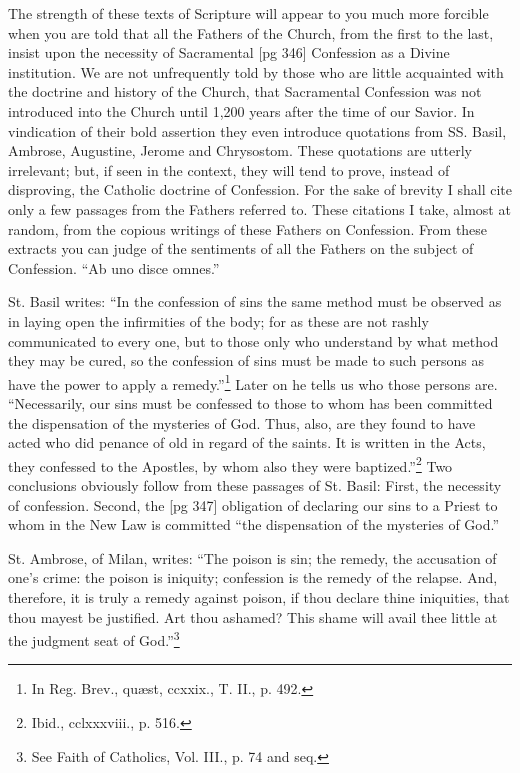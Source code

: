 The strength of these texts of Scripture will appear
to you much more forcible when you are told
that all the Fathers of the Church, from the first
to the last, insist upon the necessity of Sacramental
[pg 346]
Confession as a Divine institution. We
are not unfrequently told by those who are little
acquainted with the doctrine and history of
the Church, that Sacramental Confession was not
introduced into the Church until 1,200 years after
the time of our Savior. In vindication of their
bold assertion they even introduce quotations from
SS. Basil, Ambrose, Augustine, Jerome and
Chrysostom. These quotations are utterly irrelevant;
but, if seen in the context, they will tend
to prove, instead of disproving, the Catholic doctrine
of Confession. For the sake of brevity I
shall cite only a few passages from the Fathers
referred to. These citations I take, almost at
random, from the copious writings of these
Fathers on Confession. From these extracts you
can judge of the sentiments of all the Fathers on
the subject of Confession. “Ab uno disce omnes.”

St. Basil writes: “In the confession of sins the
same method must be observed as in laying open
the infirmities of the body; for as these are not
rashly communicated to every one, but to those
only who understand by what method they may be
cured, so the confession of sins must be made to
such persons as have the power to apply a
remedy.”\footnote{In Reg. Brev.,
quæst, ccxxix., T. II., p. 492.}
Later on he tells us who those persons
are. “Necessarily, our sins must be confessed
to those to whom has been committed the
dispensation of the mysteries of God. Thus, also,
are they found to have acted who did penance of
old in regard of the saints. It is written in the
Acts, they confessed to the Apostles, by whom also
they were baptized.”\footnote{Ibid.,
cclxxxviii., p. 516.} Two conclusions obviously
follow from these passages of St. Basil:
First, the necessity of confession. Second, the
[pg 347]
obligation of declaring our sins to a Priest to
whom in the New Law is committed “the dispensation
of the mysteries of God.”

St. Ambrose, of Milan, writes: “The poison is
sin; the remedy, the accusation of one's crime: the
poison is iniquity; confession is the remedy of the
relapse. And, therefore, it is truly a remedy
against poison, if thou declare thine iniquities, that
thou mayest be justified. Art thou ashamed?
This shame will avail thee little at the judgment
seat of God.”\footnote{See Faith
of Catholics, Vol. III., p. 74 and seq.}

